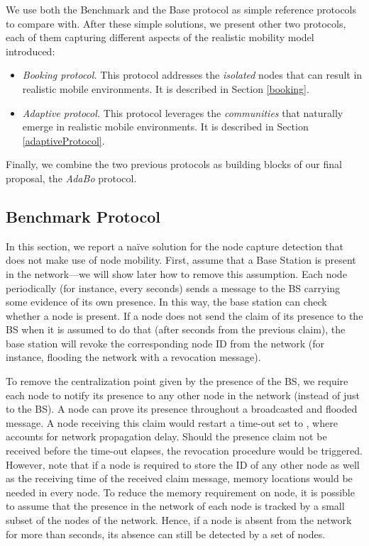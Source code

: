 \documentclass{IEEEconf}
\begin{document}
We use both the Benchmark and the Base protocol as simple reference protocols to compare with.
After these simple solutions, we present other two protocols, each of them capturing different aspects of the realistic mobility model introduced:
\begin{itemize}
\item \textit{Booking protocol.} This protocol addresses the \textit{isolated} nodes that can result in
realistic mobile environments. It is described in Section \ref{booking}.
\item \textit{Adaptive protocol.} This protocol leverages the \textit{communities} that naturally emerge in realistic mobile environments. It is described in Section \ref{adaptiveProtocol}.
\end{itemize}

Finally, we combine the two previous protocols as building blocks of our final proposal, the {\em AdaBo} protocol.



\subsection{Benchmark Protocol}
\label{benchmark}

In this section, we report a na\"{i}ve solution for the node capture detection that does not make
use of node mobility. First, assume that a Base Station is present in the network---we will show later how to remove this assumption. Each node periodically (for instance, every  seconds) sends a message to the BS carrying  some evidence of its own presence. In this way, the base station can check whether a node is present.
If a node does not send the claim of its presence to the BS when it is assumed to do that (after  seconds from the previous claim), the base station will revoke the corresponding node ID from the network  (for instance, flooding the network with a revocation message).

To remove the centralization point given by the presence of the BS, we require each node to notify its presence to any other node in the network (instead of just to the BS). A node can prove its presence throughout a broadcasted and flooded message.
A node receiving this claim would restart a time-out set to , where  accounts for network propagation delay. Should the presence claim not be received before the time-out elapses, the revocation procedure would be triggered. However, note that if a node is required to store the ID of any other node as well as the receiving time of the received claim message,  memory locations would be needed in every node.
To reduce the memory requirement on node, it is possible to assume that the presence in the network of each node is tracked by a small subset of the nodes of the network. Hence, if a node is absent from the network for more than  seconds, its absence can still be detected by a set of nodes.
\end{document}
